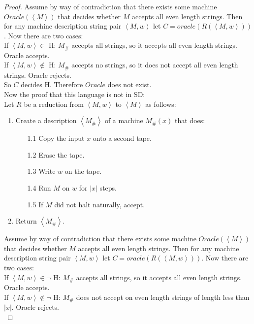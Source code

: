 \documentclass[10pt]{article}
\newcommand{\card}[1]{\left| #1 \right|}
\newcommand{\brackets}[1]{\left< #1 \right>}
\begin{document}
\begin{enumerate}[1)]
\begin{enumerate}[a)]
\begin{proof}[Proof]
Assume by way of contradiction that there exists some machine $Oracle(\brackets{M})$ that decides whether $M$ accepts all even length strings.  Then for any machine description string pair $\brackets{M, w}$ let $C = oracle(R(\brackets{M, w}))$. Now there are two cases:\\

If $\brackets{M, w} \in$ H: $M_\#$ accepts all strings, so it accepts all even length strings.  Oracle accepts.\\
If $\brackets{M, w} \not \in$ H: $M_\#$ accepts no strings, so it does not accept all even length strings.  Oracle rejects.\\

So $C$ decides H.  Therefore $Oracle$ does not exist.\\

\vspace{1cm}
\noindent
Now the proof that this language is not in SD:\\
Let $R$ be a reduction from $\brackets{M, w}$ to $\brackets{M}$ as follows:
\begin{enumerate}[1.]
\item
Create a description $\brackets{M_\#}$ of a machine $M_\#(x)$ that does:
\begin{enumerate}
\item[1.1]
Copy the input $x$ onto a second tape.

\item[1.2]
Erase the tape.

\item[1.3]
Write $w$ on the tape.

\item[1.4]
Run $M$ on $w$ for $\card{x}$ steps.

\item[1.5]
If $M$ did not halt naturally, accept.
\end{enumerate}
\item
Return $\brackets{M_\#}$.
\end{enumerate}

Assume by way of contradiction that there exists some machine $Oracle(\brackets{M})$ that decides whether $M$ accepts all even length strings.  Then for any machine description string pair $\brackets{M, w}$ let $C = oracle(R(\brackets{M, w}))$. Now there are two cases:\\

If $\brackets{M, w} \in \lnot$ H: $M_\#$ accepts all strings, so it accepts all even length strings.  Oracle accepts.\\
If $\brackets{M, w} \not \in \lnot$ H: $M_\#$ does not accept on even length strings of length less than $\card{x}$.  Oracle rejects.\\


\end{proof}
\end{enumerate}
\end{enumerate}
\end{document}
